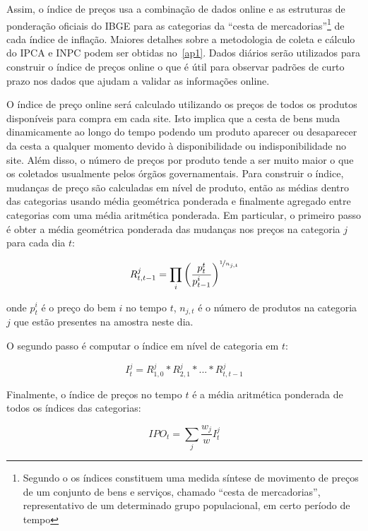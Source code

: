 \documentclass[twoside,a4paper,11pt]{report}
\begin{document}
Assim, o índice de preços usa a combinação de dados online e as estruturas de ponderação oficiais do IBGE para as categorias da “cesta de mercadorias”\footnote[1]{Segundo o \citet{ibgemetodos} os índices constituem uma medida síntese de movimento de preços de um conjunto de bens e serviços, chamado “cesta de mercadorias”, representativo de um determinado grupo populacional, em certo período de tempo} de cada índice de inflação. Maiores detalhes sobre a metodologia de coleta e cálculo do IPCA e INPC podem ser obtidas no~\ref{ap1}. Dados diários serão utilizados para construir o índice de preços online o que é útil para observar padrões de curto prazo nos dados que ajudam a validar as informações online. 
  
O índice de preço online será calculado utilizando os preços de todos os produtos disponíveis para compra em cada site. Isto implica que a cesta de bens muda dinamicamente ao longo do tempo podendo um produto aparecer ou desaparecer da cesta a qualquer momento devido à disponibilidade ou indisponibilidade no site. Além disso, o número de preços por produto tende a ser muito maior o que os coletados usualmente pelos órgãos governamentais. 
Para construir o índice, mudanças de preço são calculadas em nível de produto, então as médias dentro das categorias usando média geométrica ponderada e finalmente agregado entre categorias com uma média aritmética ponderada. Em particular, o primeiro passo é obter a média geométrica ponderada das mudanças nos preços na categoria $j$ para cada dia $t$:

\begin{equation}\label{eq1}
R_{t,t-1}^{j}=\prod_{i}\left(\frac{p_{t}^{t}}{p_{t-1}^{i}}\right)^{\nicefrac{1}{n_{j,t}}}
\end{equation}

\noindent onde $p_{t}^{i}$ é o preço do bem $i$ no tempo $t$, $n_{j,t}$ é o número de produtos na categoria $j$ que estão presentes na amostra neste dia. 

O segundo passo é computar o índice em nível de categoria em $t$:

\begin{equation}\label{eq2}
I_{t}^{j}=R_{1,0}^{j}\ast{R}_{2,1}^{j}\ast{...}\ast{R}_{t,t-1}^{j}
\end{equation}

Finalmente, o índice de preços no tempo $t$ é a média aritmética ponderada de todos os índices das categorias:

\begin{equation}
IPO_{t}=\sum_{j}{\frac{w_{j}}{w}I_{t}^{j}} 
\end{equation}
\end{document}
